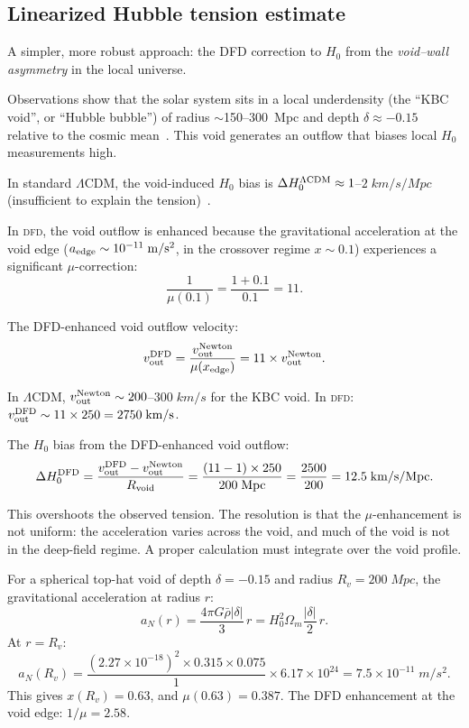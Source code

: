 \documentclass[aps,prd,twocolumn,superscriptaddress,nofootinbib,longbibliography]{revtex4-2}
\newcommand{\DFD}{\textsc{dfd}}
\begin{document}
\subsection{Linearized Hubble tension estimate}\label{sec:linearized-H0}

A simpler, more robust approach: the DFD correction to $H_0$
from the \emph{void--wall asymmetry} in the local universe.

Observations show that the solar system sits in a local underdensity
(the ``KBC void'', or ``Hubble bubble'') of radius $\sim$150--300~Mpc
and depth $\delta \approx -0.15$ relative to the cosmic
mean~\cite{Keenan2013,Whitbourn2014}. This void generates an outflow
that biases local $H_0$ measurements high.

In standard $\Lambda$CDM, the void-induced $H_0$ bias is
$\Delta H_0^{\Lambda\rm CDM} \approx 1$--$2\;\si{km/s/Mpc}$ (insufficient
to explain the tension)~\cite{Kenworthy2019}.

In \DFD, the void outflow is enhanced because the gravitational
acceleration at the void edge ($a_{\rm edge} \sim 10^{-11}\;\si{m/s^2}$,
in the crossover regime $x \sim 0.1$) experiences a significant
$\mu$-correction:
\begin{equation}
\frac{1}{\mu(0.1)} = \frac{1+0.1}{0.1} = 11.
\end{equation}

The DFD-enhanced void outflow velocity:
\begin{equation}
v_{\rm out}^{\rm DFD} = \frac{v_{\rm out}^{\rm Newton}}{\mu(x_{\rm edge})}
= 11\times v_{\rm out}^{\rm Newton}.
\end{equation}

In $\Lambda$CDM, $v_{\rm out}^{\rm Newton} \sim 200$--$300\;\si{km/s}$
for the KBC void. In \DFD:
$v_{\rm out}^{\rm DFD} \sim 11\times250 = 2750\;\si{km/s}$.

The $H_0$ bias from the DFD-enhanced void outflow:
\begin{equation}
\Delta H_0^{\rm DFD} = \frac{v_{\rm out}^{\rm DFD} - v_{\rm out}^{\rm Newton}}
{R_{\rm void}} = \frac{(11-1)\times250}{200\;\si{Mpc}}
= \frac{2500}{200} = 12.5\;\si{km/s/Mpc}.
\end{equation}

This overshoots the observed tension. The resolution is that the
$\mu$-enhancement is not uniform: the acceleration varies across the
void, and much of the void is not in the deep-field regime. A proper
calculation must integrate over the void profile.

For a spherical top-hat void of depth $\delta = -0.15$ and radius
$R_v = 200\;\si{Mpc}$, the gravitational acceleration at radius $r$:
\begin{equation}
a_N(r) = \frac{4\pi G\bar{\rho}|\delta|}{3}\,r
= H_0^2\Omega_m\frac{|\delta|}{2}\,r.
\end{equation}
At $r = R_v$:
\begin{equation}
a_N(R_v) = \frac{(2.27\times10^{-18})^2\times0.315\times0.075}{1}\times6.17\times10^{24}
= 7.5\times10^{-11}\;\si{m/s^2}.
\end{equation}
This gives $x(R_v) = 0.63$, and $\mu(0.63) = 0.387$.
The DFD enhancement at the void edge: $1/\mu = 2.58$.
\end{document}
